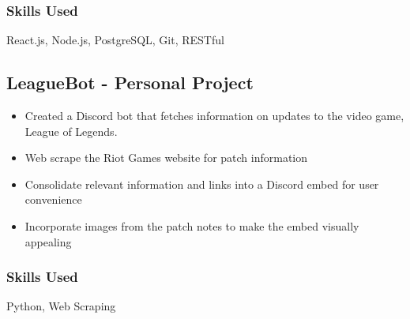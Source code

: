 \documentclass[11pt, letterpaper]{article}
\begin{document}
            \subsubsection{Skills Used}
                React.js, Node.js, PostgreSQL, Git, RESTful
        \subsection{LeagueBot - Personal Project}
            \begin{itemize}[nosep]
                \item Created a Discord bot that fetches information on updates to the video game, League 
                of Legends.
                \item Web scrape the Riot Games website for patch information
                \item Consolidate relevant information and links into a Discord embed for user convenience
                \item Incorporate images from the patch notes to make the embed visually appealing
            \end{itemize}
            \subsubsection{Skills Used}
                Python, Web Scraping
\end{document}
